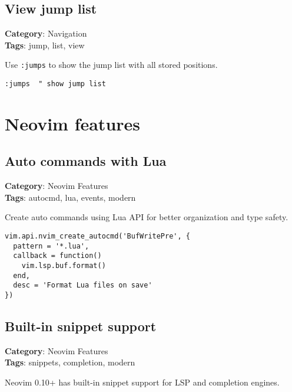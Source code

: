 {{{{{{{{{\section{View jump list}

\textbf{Category}: Navigation\\ \textbf{Tags}: jump, list, view
\vspace{0.5cm}

Use {\footnotesize \Verb§:jumps§} to show the jump list with all stored positions.

\begin{Exa*}{}
\begin{Verbatim}[fontsize=\footnotesize, breaklines, breakanywhere]
:jumps  " show jump list
\end{Verbatim}
\end{Exa*}

\chapter{Neovim features}
\section{Auto commands with Lua}

\textbf{Category}: Neovim Features\\ \textbf{Tags}: autocmd, lua, events, modern
\vspace{0.5cm}

Create auto commands using Lua API for better organization and type safety.

\begin{Exa*}{}
\begin{Verbatim}[fontsize=\footnotesize, breaklines, breakanywhere]
vim.api.nvim_create_autocmd('BufWritePre', {
  pattern = '*.lua',
  callback = function()
    vim.lsp.buf.format()
  end,
  desc = 'Format Lua files on save'
})
\end{Verbatim}
\end{Exa*}

\section{Built-in snippet support}

\textbf{Category}: Neovim Features\\ \textbf{Tags}: snippets, completion, modern
\vspace{0.5cm}

Neovim 0.10+ has built-in snippet support for LSP and completion engines.

}}}}}}}}}

